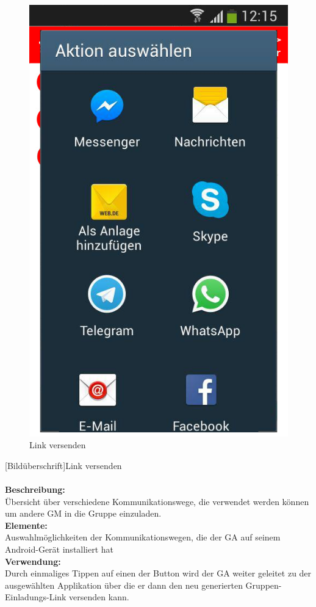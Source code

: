 \begin{figure}
	\caption{Link versenden}
	\includegraphics[scale =0.5]{resources/images/link_versenden.png}
\end{figure}

[Bildüberschrift]Link versenden\\ \\
\textbf{Beschreibung:}\\
Übersicht über verschiedene Kommunikationswege, die verwendet werden können um andere GM in die Gruppe einzuladen.\\
\textbf{Elemente:}\\
Auswahlmöglichkeiten der Kommunikationswegen, die der GA auf seinem Android-Gerät installiert hat\\
\textbf{Verwendung:}\\
Durch einmaliges Tippen auf einen der Button wird der GA weiter geleitet zu der ausgewählten Applikation über die er dann den neu generierten Gruppen-Einladungs-Link versenden kann.
\newpage

